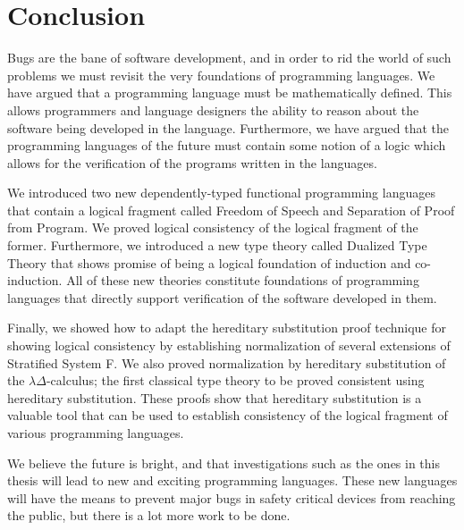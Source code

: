 \documentclass[phd,appendix,dedicationpage,ackpage,epigraphpage,figures]{uithesis}
\begin{document}
\chapter*{Conclusion}
\label{chap:conclusion}

Bugs are the bane of software development, and in order to rid the
world of such problems we must revisit the very foundations of
programming languages.  We have argued that a programming language
must be mathematically defined.  This allows programmers and language
designers the ability to reason about the software being developed in
the language.  Furthermore, we have argued that the programming
languages of the future must contain some notion of a logic which
allows for the verification of the programs written in the languages.

We introduced two new dependently-typed functional programming
languages that contain a logical fragment called Freedom of Speech and
Separation of Proof from Program.  We proved logical consistency of
the logical fragment of the former.  Furthermore, we introduced a new
type theory called Dualized Type Theory that shows promise of being a
logical foundation of induction and co-induction.  All of these new
theories constitute foundations of programming languages that directly
support verification of the software developed in them.

Finally, we showed how to adapt the hereditary substitution proof
technique for showing logical consistency by establishing
normalization of several extensions of Stratified System F.  We also
proved normalization by hereditary substitution of the
$\lambda\Delta$-calculus; the first classical type theory to be proved
consistent using hereditary substitution.  These proofs show that
hereditary substitution is a valuable tool that can be used to
establish consistency of the logical fragment of various programming
languages.

We believe the future is bright, and that investigations such as the
ones in this thesis will lead to new and exciting programming
languages.  These new languages will have the means to prevent major
bugs in safety critical devices from reaching the public, but there is
a lot more work to be done.
\end{document}
